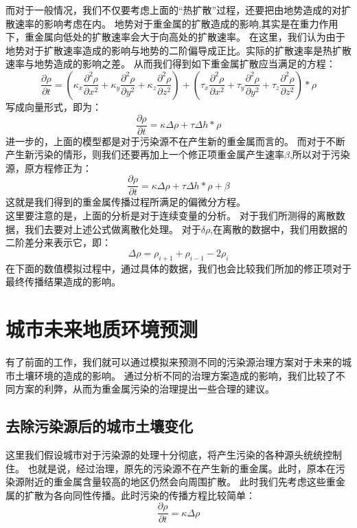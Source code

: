\documentclass[a4paper]{article}
\begin{document}
\indent 而对于一般情况，我们不仅要考虑上面的“热扩散”过程，还要把由地势造成的对扩散速率的影响考虑在内。
地势对于重金属的扩散造成的影响,其实是在重力作用下，重金属向低处的扩散速率会大于向高处的扩散速率。
在这里，我们认为由于地势对于扩散速率造成的影响与地势的二阶偏导成正比。实际的扩散速率是热扩散速率与地势造成的影响之差。
从而我们得到如下重金属扩散应当满足的方程：
\begin{equation}
\frac{\partial \rho}{\partial t} 
= (\kappa_x\frac{\partial^2 \rho}{\partial x^2}+\kappa_y\frac{\partial^2 \rho}{\partial y^2}+\kappa_z\frac{\partial^2 \rho}{\partial z^2})
+( \tau_x\frac{\partial^2 \rho}{\partial x^2}+\tau_y\frac{\partial^2 \rho}{\partial y^2}+\tau_z\frac{\partial^2 \rho}{\partial z^2})*\rho
\end{equation}
写成向量形式，即为：
\begin{equation}
\frac{\partial \rho}{\partial t} = \kappa \Delta \rho + \tau \Delta h *\rho
\end{equation}
\indent 进一步的，上面的模型都是对于污染源不在产生新的重金属而言的。
而对于不断产生新污染的情形，则我们还要再加上一个修正项重金属产生速率$\beta$,所以对于污染源，原方程修正为：
\begin{equation}
\label{eqn_model}
\frac{\partial \rho}{\partial t} = \kappa \Delta \rho + \tau \Delta h *\rho + \beta
\end{equation}
这就是我们得到的重金属传播过程所满足的偏微分方程。  \\
\indent 这里要注意的是，上面的分析是对于连续变量的分析。
对于我们所测得的离散数据，我们去要对上述公式做离散化处理。
对于$\delta \rho $,在离散的数据中，我们用数据的二阶差分来表示它，即：
\begin{equation}
\Delta \rho= \rho_{i+1}+\rho_{i-1}-2\rho_i
\end{equation}
在下面的数值模拟过程中，通过具体的数据，我们也会比较我们所加的修正项对于最终传播结果造成的影响。


\section{城市未来地质环境预测}
有了前面的工作，我们就可以通过模拟来预测不同的污染源治理方案对于未来的城市土壤环境的造成的影响。
通过分析不同的治理方案造成的影响，我们比较了不同方案的利弊，从而为重金属污染的治理提出一些合理的建议。

\subsection{去除污染源后的城市土壤变化}
这里我们假设城市对于污染源的处理十分彻底，将产生污染的各种源头统统控制住。
也就是说，经过治理，原先的污染源不在产生新的重金属。此时，原本在污染源附近的重金属含量较高的地区仍然会向周围扩散。
此时我们先考虑这些重金属的扩散为各向同性传播。此时污染的传播方程比较简单：
\begin{equation}
\frac{\partial \rho}{\partial t} = \kappa  \Delta \rho
\end{equation}
\end{document}
